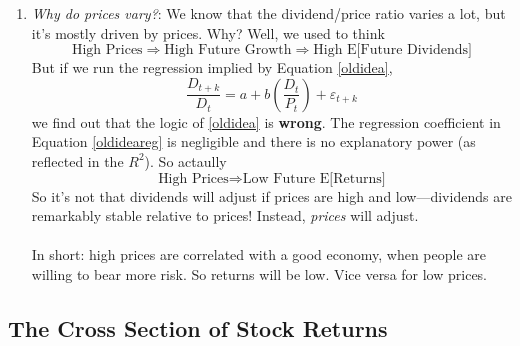 \documentclass[12pt]{article}
\theoremstyle{plain}
\theoremstyle{definition}
\theoremstyle{remark}
\begin{document}
\begin{enumerate}
	Recall that it was puzzling
	that stocks should earn 7\% over bonds. Now we're saying that
	they earn 7\% over bonds \emph{and} vary with a standard
	deviation of about 6\% a year. Average \emph{changes} in
	$ER^e_{t\rightarrow t+k}$ are about as much as the average
	confounding \emph{level}.\footnote{Of course, \emph{actual}
	returns vary even more than expected returns---recall about
	17\%.}
    \item {\sl Why do prices vary?}: We know that the dividend/price
	ratio varies a lot, but it's mostly driven by prices. Why?
	Well, we used to think
	\begin{equation}
	    \label{oldidea}
	    \text{High Prices} \Rightarrow \text{High Future Growth}
		\Rightarrow \text{High E[Future Dividends]}
	\end{equation}
	But if we run the regression implied by Equation \ref{oldidea},
	\begin{equation}
	    \label{oldideareg}
	    \frac{D_{t+k}}{D_t} = a + b \left(\frac{D_t}{P_t}\right)
		+ \varepsilon_{t+k}
	\end{equation}
	we find out that the logic of \ref{oldidea} is \textbf{wrong}.
	The regression coefficient in Equation \ref{oldideareg} is
	negligible and there is no explanatory power (as
	reflected in the $R^2$).  So actaully
	\begin{equation}
	    \label{newidea}
	    \text{High Prices} \Rightarrow \text{Low Future E[Returns]}
	\end{equation}
	So it's not that dividends will adjust if prices are high
	and low---dividends are remarkably stable relative to prices!
	Instead, \emph{prices} will adjust.
	\\
	\\
	In short: high prices are correlated with a good economy,
	when people are willing to bear more risk.  So returns will
	be low. Vice versa for low prices.
\end{enumerate}


\subsection{The Cross Section of Stock Returns}
\end{document}
